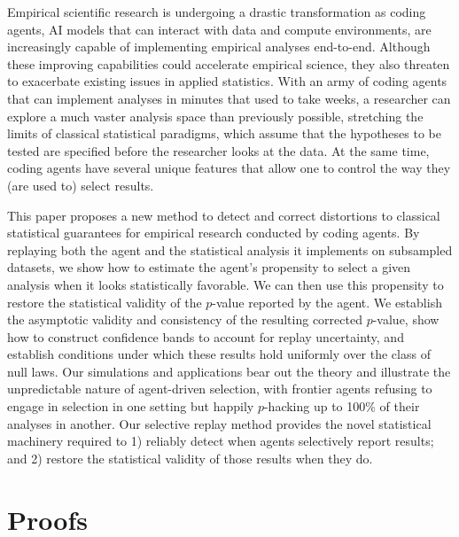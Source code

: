 \documentclass[10pt]{article}
\begin{document}
Empirical scientific research is undergoing a drastic transformation as coding agents, AI models that can interact with data and compute environments, are increasingly capable of implementing empirical analyses end-to-end. Although these improving capabilities could accelerate empirical science, they also threaten to exacerbate existing issues in applied statistics. With an army of coding agents that can implement analyses in minutes that used to take weeks, a researcher can explore a much vaster analysis space than previously possible, stretching the limits of classical statistical paradigms, which assume that the hypotheses to be tested are specified before the researcher looks at the data. At the same time, coding agents have several unique features that allow one to control the way they (are used to) select results.

This paper proposes a new method to detect and correct distortions to classical statistical guarantees for empirical research conducted by coding agents. By replaying both the agent and the statistical analysis it implements on subsampled datasets, we show how to estimate the agent's propensity to select a given analysis when it looks statistically favorable. We can then use this propensity to restore the statistical validity of the $p$-value reported by the agent. We establish the asymptotic validity and consistency of the resulting corrected $p$-value, show how to construct confidence bands to account for replay uncertainty, and establish conditions under which these results hold uniformly over the class of null laws. Our simulations and applications bear out the theory and illustrate the unpredictable nature of agent-driven selection, with frontier agents refusing to engage in selection in one setting but happily $p$-hacking up to 100\% of their analyses in another. Our selective replay method provides the novel statistical machinery required to 1) reliably detect when agents selectively report results; and 2) restore the statistical validity of those results when they do.

\clearpage
\appendix




\clearpage
\section{Proofs}
\end{document}
